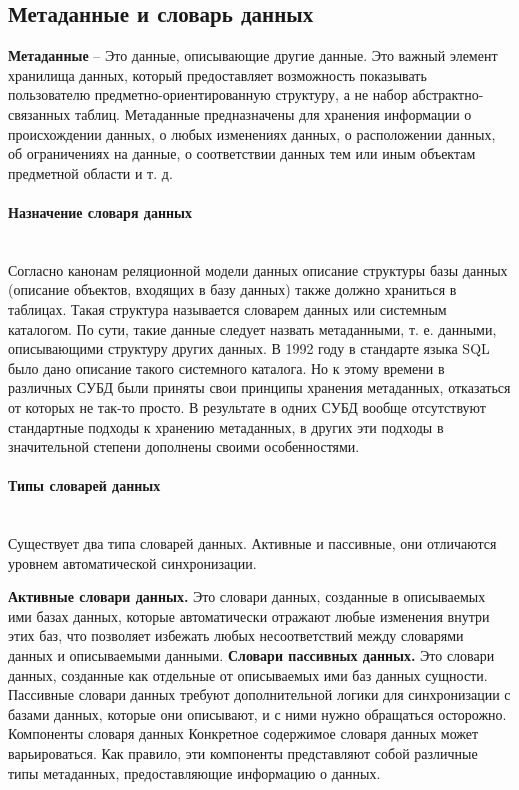\subsection{Метаданные и словарь данных}

\begin{grayquote}
	\textbf{Метаданные} -- Это данные, описывающие другие данные. Это важный
элемент хранилища данных, который предоставляет возможность показывать пользователю предметно-ориентированную структуру, а не набор абстрактно-связанных таблиц. Метаданные предназначены для хранения
информации о происхождении данных, о любых изменениях данных, о
расположении данных, об ограничениях на данные, о соответствии данных тем или иным объектам предметной области и т. д. \autocite{Pirogov2009}
\end{grayquote}

\paragraph{Назначение словаря данных} ~\\

Согласно канонам реляционной модели данных описание структуры базы
данных (описание объектов, входящих в базу данных) также должно храниться в таблицах. Такая структура называется словарем данных или системным каталогом. По сути, такие данные следует назвать метаданными, т. е. данными, описывающими структуру других
данных.
В 1992 году в стандарте языка SQL было дано описание такого системного
каталога. Но к этому времени в различных СУБД были приняты свои принципы хранения метаданных, отказаться от которых не так-то просто. В результате в одних СУБД вообще отсутствуют стандартные подходы к хранению метаданных, в других эти подходы в значительной степени дополнены своими особенностями. \autocite{Pirogov2009}

\paragraph{Типы словарей данных} ~\\

Существует два типа словарей данных. Активные и пассивные, они отличаются уровнем автоматической синхронизации.

\textbf{Активные словари данных.} Это словари данных, созданные в описываемых ими базах данных, которые автоматически отражают любые изменения внутри этих баз, что позволяет избежать любых несоответствий между словарями данных и описываемыми данными.
\textbf{Словари пассивных данных.} Это словари данных, созданные как отдельные от описываемых ими баз данных сущности. Пассивные словари данных требуют дополнительной логики для синхронизации с базами данных, которые они описывают, и с ними нужно обращаться осторожно.
Компоненты словаря данных
Конкретное содержимое словаря данных может варьироваться. Как правило, эти компоненты представляют собой различные типы метаданных, предоставляющие информацию о данных. \autocite{DataDictionary}

